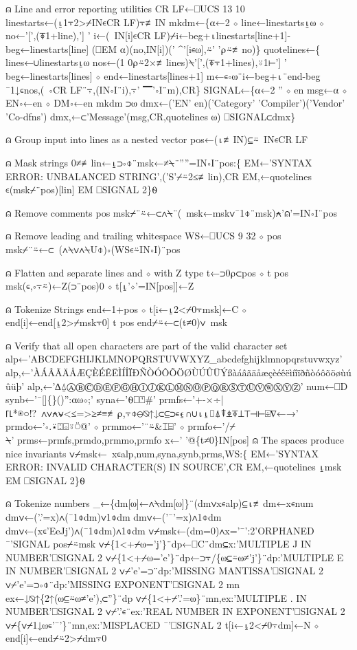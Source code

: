 \documentclass{article}%
\begin{document}
⍝ Line and error reporting utilities
   CR LF←⎕UCS 13 10
   linestarts←(⍸1⍪2>⌿IN∊CR LF)⍪≢IN
   mkdm←\{⍺←2 ⋄ line←linestarts⍸⍵ ⋄ no←'[',(⍕1+line),'] '
     i←(~IN[i]∊CR LF)⌿i←beg+⍳linestarts[line+1]-beg←linestarts[line]
     (⎕EM ⍺)(no,IN[i])(' ^'[i∊⍵],⍨' '⍴⍨≢no)\}
   quotelines←\{
     lines←∪linestarts⍸⍵
     nos←(1 0⍴⍨2×≢lines)⍀'[',(⍕⍪1+lines),⍤1⊢'] '
     beg←linestarts[lines] ⋄ end←linestarts[lines+1]
     m←∊∘⍵¨i←beg+⍳¨end-beg
     ¯1↓∊nos,(~∘CR LF¨⍪,(IN∘I¨i),⍪' ▔'∘I¨m),CR\}
   SIGNAL←\{⍺←2 '' ⋄ en msg←⍺ ⋄ EN∘←en ⋄ DM∘←en mkdm ⊃⍵
     dmx←('EN' en)('Category' 'Compiler')('Vendor' 'Co-dfns')
     dmx,←⊂'Message'(msg,CR,quotelines ⍵)
     ⎕SIGNAL⊂dmx\}

⍝ Group input into lines as a nested vector
   pos←(⍳≢IN)⊆⍨~IN∊CR LF

⍝ Mask strings
   0≠≢lin←⍸⊃∘⌽¨msk←≠⍀¨''''=IN∘I¨pos:\{
     EM←'SYNTAX ERROR: UNBALANCED STRING',('S'⌿⍨2≤≢lin),CR
     EM,←quotelines ∊(msk⌿¨pos)[lin]
     EM ⎕SIGNAL 2\}⍬

⍝ Remove comments
   pos msk⌿¨⍨←⊂∧⍀¨(~msk←msk∨¯1⌽¨msk)⍲'⍝'=IN∘I¨pos

⍝ Remove leading and trailing whitespace
   WS←⎕UCS 9 32 ⋄ pos msk⌿¨⍨←⊂~(∧⍀∨∧⍀U⌽)∘(WS∊⍨IN∘I)¨pos

⍝ Flatten and separate lines and ⋄ with Z type
   t←⊃0⍴⊂pos ⋄ t pos msk(∊,∘⍪⍨)←Z(⊃¨pos)0 ⋄ t[⍸'⋄'=IN[pos]]←Z

⍝ Tokenize Strings
   end←1+pos ⋄ t[i←⍸2<⌿0⍪msk]←C ⋄ end[i]←end[⍸2>⌿msk⍪0]
   t pos end⌿⍨←⊂(t≠0)∨~msk

⍝ Verify that all open characters are part of the valid character set
   alp←'ABCDEFGHIJKLMNOPQRSTUVWXYZ_abcdefghijklmnopqrstuvwxyz'
   alp,←'ÀÁÂÃÄÅÆÇÈÉÊËÌÍÎÏÐÑÒÓÔÕÖØÙÚÛÜÝßàáâãäåæçèéêëìíîïðñòóôõöøùúûüþ'
   alp,←'∆⍙ⒶⒷⒸⒹⒺⒻⒼⒽⒾⒿⓀⓁⓂⓃⓄⓅⓆⓇⓈⓉⓊⓋⓌⓍⓎⓏ'
   num←⎕D
   synb←'¯[]\{\}()'':⍺⍵⋄;'
   syna←'⍬⎕⍞#'
   prmfs←'+-×÷|⌈⌊*⍟○!?~∧∨⍲⍱<≤=>≥≠≡≢⍴,⍪⌽⊖⍉↑↓⊂⊆⊃∊⍷∩∪⍳⍸⌷⍋⍒⍎⍕⊥⊤⊣⊢⌹∇←→'
   prmdo←'∘.⍣⍠⌺⍤⍥@' ⋄ prmmo←'¨⍨&⌶⌸' ⋄ prmfo←'/⌿\\⍀'
   prms←prmfs,prmdo,prmmo,prmfo
   x←' '@\{t≠0\}IN[pos] ⍝ The spaces produce nice invariants
   ∨⌿msk←~x∊alp,num,syna,synb,prms,WS:\{
     EM←'SYNTAX ERROR: INVALID CHARACTER(S) IN SOURCE',CR
     EM,←quotelines ⍸msk
     EM ⎕SIGNAL 2\}⍬

⍝ Tokenize numbers
   _←\{dm[⍵]←∧⍀dm[⍵]\}¨(dm∨x∊alp)⊆⍳≢dm←x∊num
   dm∨←('.'=x)∧(¯1⌽dm)∨1⌽dm
   dm∨←('¯'=x)∧1⌽dm
   dm∨←(x∊'EeJj')∧(¯1⌽dm)∧1⌽dm
   ∨⌿msk←(dm=0)∧x='¯':2'ORPHANED ¯'SIGNAL pos⌿⍨msk
   ∨⌿\{1<+⌿⍵='j'\}¨dp←⎕C¨dm⊆x:'MULTIPLE J IN NUMBER'⎕SIGNAL 2
   ∨⌿\{1<+⌿⍵='e'\}¨dp←⊃⍪/\{⍵⊆⍨⍵≠'j'\}¨dp:'MULTIPLE E IN NUMBER'⎕SIGNAL 2
   ∨⌿'e'=⊃¨dp:'MISSING MANTISSA'⎕SIGNAL 2
   ∨⌿'e'=⊃∘⌽¨dp:'MISSING EXPONENT'⎕SIGNAL 2
   mn ex←↓⍉↑\{2↑(⍵⊆⍨⍵≠'e'),⊂''\}¨dp
   ∨⌿\{1<+⌿'.'=⍵\}¨mn,ex:'MULTIPLE . IN NUMBER'⎕SIGNAL 2
   ∨⌿'.'∊¨ex:'REAL NUMBER IN EXPONENT'⎕SIGNAL 2
   ∨⌿\{∨⌿1↓⍵∊'¯'\}¨mn,ex:'MISPLACED ¯'⎕SIGNAL 2
   t[i←⍸2<⌿0⍪dm]←N ⋄ end[i]←end⌿⍨2>⌿dm⍪0
\end{document}
